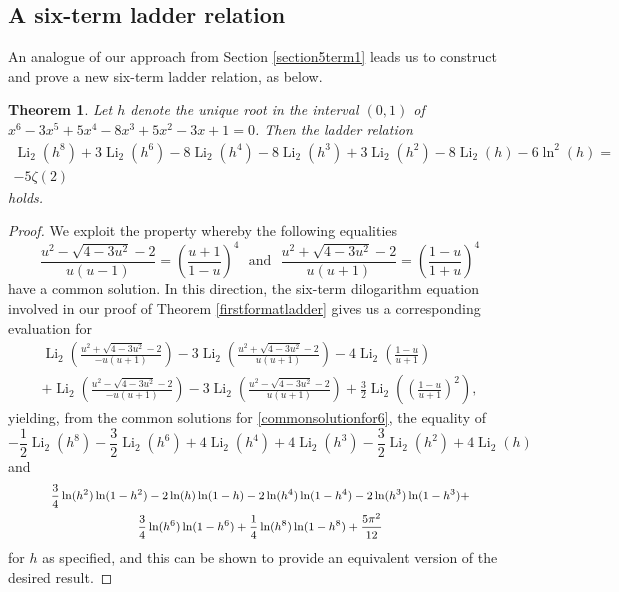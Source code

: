 \documentclass[12pt]{article}
\newtheorem{theorem}{Theorem}
\begin{document}
\subsection{A six-term ladder relation}
 An analogue of our approach from Section \ref{section5term1} leads us to construct and prove a new six-term ladder relation, 
 as below. 

\begin{theorem}\label{theoremnew6term}
 Let $h$ denote the unique root in the interval $(0, 1)$ of $x^6-3 x^5+5 x^4-8 x^3+5 x^2-3 x+1 = 0$. Then the ladder relation 
\begin{multline*}
 \operatorname{Li}_2\left(h^8\right) + 3 \operatorname{Li}_2\left(h^6\right) - 
 8 \operatorname{Li}_2\left(h^4\right) - 8 \operatorname{Li}_2\left(h^3\right) + 
 3 \operatorname{Li}_2\left(h^2\right) - 8 \operatorname{Li}_2(h)-6 \ln ^2(h) = \\ 
 -5 \zeta(2) 
\end{multline*}
 holds. 
\end{theorem}

\begin{proof}
 We exploit the property whereby the following equalities 
\begin{equation}\label{commonsolutionfor6}
 \frac{u^2 - \sqrt{4 - 3u^2} - 2}{u(u - 1)} = \left( \frac{u + 1}{1 - u} \right)^4 
 \ \ \ \text{and} \ \ \ 
 \frac{u^2 + \sqrt{4 - 3u^2} - 2}{u(u + 1)} = \left( \frac{1 - u}{1 + u} \right)^4 
\end{equation}
 have a common solution. In this direction, the six-term dilogarithm equation 
 involved in our proof of Theorem \ref{firstformatladder} gives us a corresponding evaluation for 
\begin{multline*}
 \operatorname{Li}_2\left( \frac{u^2 + \sqrt{4 - 3u^2} - 2}{-u(u + 1)} \right) 
 - 3 \operatorname{Li}_2\left( \frac{u^2 + \sqrt{4 - 3u^2} - 2}{u(u + 1)} \right) 
 - 4 \operatorname{Li}_2\left( \frac{1 - u}{u + 1} \right) \\ 
 + \operatorname{Li}_2\left( \frac{u^2 - \sqrt{4 - 3u^2} - 2}{-u(u + 1)} \right) 
 - 3 \operatorname{Li}_2\left( \frac{u^2 - \sqrt{4 - 3u^2} - 2}{u(u + 1)} \right) 
 + \frac{3}{2} \operatorname{Li}_2\left( \left( \frac{1 - u}{u + 1} \right)^2 \right), 
\end{multline*}
 yielding, from the common solutions for \eqref{commonsolutionfor6}, the equality of 
 $$ - \frac{1}{2} \operatorname{Li}_2(h^8) 
 - \frac{3}{2} \operatorname{Li}_2(h^6) 
 + 4 \operatorname{Li}_2(h^4) 
 + 4 \operatorname{Li}_2(h^3) 
 -\frac{3}{2} \operatorname{Li}_2(h^2) 
 + 4 \operatorname{Li}_2(h) $$ and 
\begin{multline*}
 \text{ { \footnotesize $ \frac{3}{4} \ln(h^2) \ln(1 - h^2)
 - 2 \ln(h) \ln(1 - h)
 - 2 \ln(h^4) \ln(1 - h^4) 
 - 2 \ln(h^3) \ln(1 - h^3) + $ } } \\ 
 \text{{ \footnotesize $ \frac{3}{4} \ln(h^6) \ln(1 - h^6) + \frac{1}{4} \ln(h^8) \ln(1 - h^8) + \frac{5\pi^2}{12} $ }}
\end{multline*}
 for $h$ as specified, and this can be shown
 to provide an equivalent version of the desired result. 
\end{proof}
\end{document}
